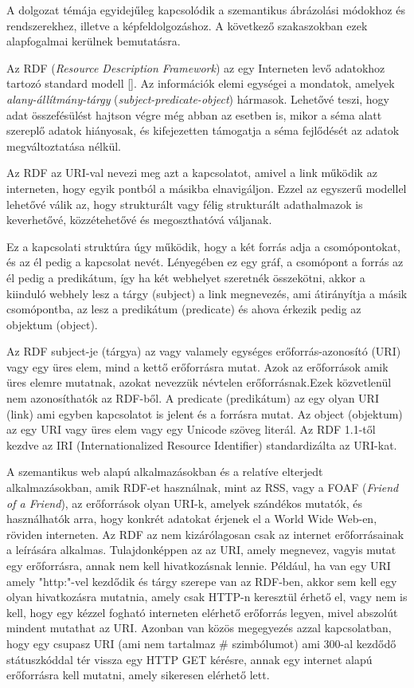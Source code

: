 
A dolgozat témája egyidejűleg kapcsolódik a szemantikus ábrázolási módokhoz és rendszerekhez, illetve a képfeldolgozáshoz. A következő szakaszokban ezek alapfogalmai kerülnek bemutatásra.

\cite{rdfa_with_example}

Az RDF (\textit{Resource Description Framework}) az egy Interneten levő adatokhoz tartozó standard modell []. Az információk elemi egységei a mondatok, amelyek \textit{alany-állítmány-tárgy} (\textit{subject-predicate-object}) hármasok. Lehetővé teszi, hogy adat összefésülést hajtson végre még abban az esetben is, mikor a séma alatt szereplő adatok hiányosak, és kifejezetten támogatja a séma fejlődését az adatok megváltoztatása nélkül.

Az RDF az URI-val nevezi meg azt a kapcsolatot, amivel a link működik az interneten, hogy egyik pontból a másikba elnavigáljon. Ezzel az egyszerű modellel lehetővé válik az, hogy strukturált vagy félig strukturált adathalmazok is keverhetővé, közzétehetővé és megoszthatóvá váljanak.

Ez a kapcsolati struktúra úgy működik, hogy a két forrás adja a csomópontokat, és az él pedig a kapcsolat nevét. Lényegében ez egy gráf, a csomópont a forrás az él pedig a predikátum, így ha két webhelyet szeretnék összekötni, akkor a kiinduló webhely lesz a tárgy (subject) a link megnevezés, ami átirányítja a másik csomópontba, az lesz a predikátum (predicate) és ahova érkezik pedig az objektum (object).

Az RDF subject-je (tárgya) az vagy valamely egységes erőforrás-azonosító (URI) vagy egy üres elem, mind a kettő erőforrásra mutat. Azok az erőforrások amik üres elemre mutatnak, azokat nevezzük névtelen erőforrásnak.Ezek közvetlenül nem azonosíthatók az RDF-ből. A predicate (predikátum) az egy olyan URI (link) ami egyben kapcsolatot is jelent és a forrásra mutat. Az object (objektum) az egy URI vagy üres elem vagy egy Unicode szöveg literál. Az RDF 1.1-től kezdve az IRI (Internationalized Resource Identifier) standardizálta az URI-kat.

A szemantikus web alapú alkalmazásokban és a relatíve elterjedt alkalmazásokban, amik RDF-et használnak, mint az RSS, vagy a FOAF (\textit{Friend of a Friend}), az erőforrások olyan URI-k, amelyek szándékos mutatók, és használhatók arra, hogy konkrét adatokat érjenek el a World Wide Web-en, röviden interneten. Az RDF az nem kizárólagosan csak az internet erőforrásainak a leírására alkalmas. Tulajdonképpen az az URI, amely megnevez, vagyis mutat egy erőforrásra, annak nem kell hivatkozásnak lennie. Például, ha van egy URI amely "http:"-vel kezdődik és tárgy szerepe van az RDF-ben, akkor sem kell egy olyan hivatkozásra mutatnia, amely csak HTTP-n keresztül érhető el, vagy nem is kell, hogy egy kézzel fogható interneten elérhető erőforrás legyen, mivel abszolút mindent mutathat az URI. Azonban van közös megegyezés azzal kapcsolatban, hogy egy csupasz URI (ami nem tartalmaz \# szimbólumot) ami 300-al kezdődő státuszkóddal tér vissza egy HTTP GET kérésre, annak egy internet alapú erőforrásra kell mutatni, amely sikeresen elérhető lett.


